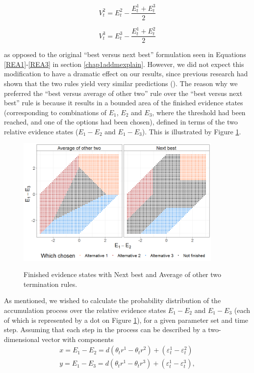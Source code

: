 \documentclass[11pt,a4paper]{article}
\begin{document}
\begin{equation} \label{REA2pd}
V_{t}^{2}=E_{t}^{2}-\frac{E_{t}^{1}+E_{t}^{3}}{2}
\end{equation}


\begin{equation} \label{REA3pd}
V_{t}^{3}=E_{t}^{3}-\frac{E_{t}^{1}+E_{t}^{2}}{2}
\end{equation}

as opposed to the original ``best versus next best'' formulation seen in Equations \ref{REA1}-\ref{REA3} in section \ref{chap1addmexplain}. However, we did not expect this modification to have a dramatic effect on our results, since previous research had shown that the two rules yield very similar predictions (). The reason why we preferred the ``best versus average of other two'' rule over the ``best versus next best'' rule is because it results in a bounded area of the finished evidence states (corresponding to combinations of $E_{1}$, $E_{2}$ and $E_{3}$, where the threshold had been reached, and one of the options had been chosen), defined in terms of the two relative evidence states ($E_{1}-E_{2}$ and $E_{1}-E_{3}$). This is illustrated by Figure \ref{fig:rulesfinished}.

\begin{figure}[htp!]
\captionsetup{justification=centering}
\centering
\caption{Finished evidence states with Next best and Average of other two termination rules.}
\includegraphics[width=0.9\textwidth]{./rulesfinished.png}
\label{fig:rulesfinished}
\end{figure}

As mentioned, we wished to calculate the probability distribution of the accumulation process over the relative evidence states $E_{1}-E_{2}$ and $E_{1}-E_{3}$ (each of which is represented by a dot on Figure \ref{fig:rulesfinished}), for a given parameter set and time step. Assuming that each step in the process can be described by a two-dimensional vector with components
\begin{equation}
\begin{array}{l}
\displaystyle x = E_{1}-E_{2} = d(\theta_{t}r^1-\theta_{t}r^2) + (\varepsilon_{t}^{1}-\varepsilon_{t}^{2})\\
\displaystyle y = E_{1}-E_{3} = d(\theta_{t}r^1-\theta_{t}r^3) + (\varepsilon_{t}^{1}-\varepsilon_{t}^{3}),\\
\end{array} 
\label{eq:axes1}
\end{equation}
\end{document}
